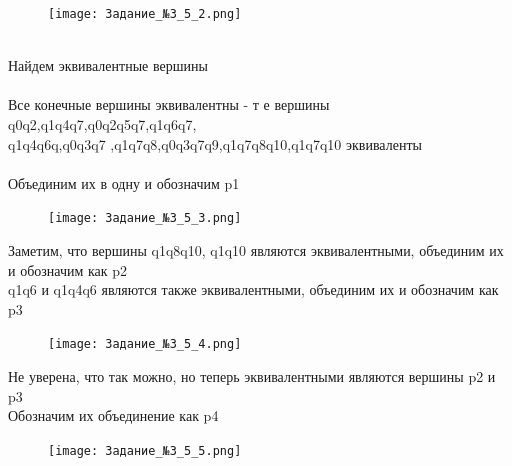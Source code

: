 \documentclass[a4paper]{article}
\begin{document}
\begin{enumerate}
\begin{figure}[h]
\centering
\texttt{[image: Задание\_№3\_5\_2.png]}
\end{figure}
\\Найдем эквивалентные вершины\\
\\Все конечные вершины эквивалентны - т е вершины q0q2,q1q4q7,q0q2q5q7,q1q6q7,\\q1q4q6q,q0q3q7
,q1q7q8,q0q3q7q9,q1q7q8q10,q1q7q10 эквиваленты\\
\\Объединим их в одну и обозначим p1\\
\begin{figure}[h]
\centering
\texttt{[image: Задание\_№3\_5\_3.png]}
\end{figure}
\hfill \break
Заметим, что вершины q1q8q10, q1q10 являются эквивалентными, объединим их и обозначим как p2\\
q1q6 и q1q4q6 являются также эквивалентными, объединим их и обозначим как p3\\
\begin{figure}[h]
\centering
\texttt{[image: Задание\_№3\_5\_4.png]}
\end{figure}
\newpage
Не уверена, что так можно, но теперь эквивалентными являются вершины p2 и p3\\
Обозначим их объединение как p4\\

\begin{figure}[h]
\centering
\texttt{[image: Задание\_№3\_5\_5.png]}
\end{figure}

\end{enumerate}
\newpage


\newpage
\end{document}
